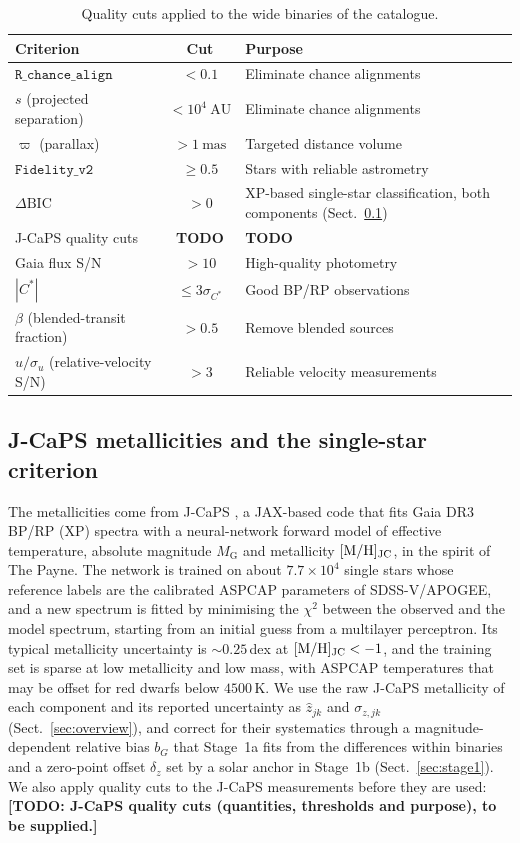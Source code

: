 \documentclass{aa}
\begin{document}
\begin{table}[ht]
\centering
\caption{Quality cuts applied to the wide binaries of the \citet{ElBadry2021MillionBinaries} catalogue.}
\label{tab:quality_cuts}
\begin{tabular}{@{}lcl@{}}
\toprule
Criterion & Cut & Purpose \\
\midrule
$\texttt{R\_chance\_align}$ & $<0.1$ & Eliminate chance alignments \\
$s$ (projected separation) & $<10^4~\mathrm{AU}$ & Eliminate chance alignments \\
$\varpi$ (parallax) & $>1~\mathrm{mas}$ & Targeted distance volume \\
$\texttt{Fidelity\_v2}$ & $\geq 0.5$ & Stars with reliable astrometry \\
$\Delta\mathrm{BIC}$ & $>0$ & XP-based single-star classification, both components (Sect.~\ref{sec:jcaps}) \\
J-CaPS quality cuts & \textbf{TODO} & \textbf{TODO} \\
Gaia flux S/N & $>10$ & High-quality photometry \\
$|C^\ast|$ & $\leq 3\sigma_{C^\ast}$ & Good BP/RP observations \\
$\beta$ (blended-transit fraction) & $>0.5$ & Remove blended sources \\
$u/\sigma_u$ (relative-velocity S/N) & $>3$ & Reliable velocity measurements \\
\bottomrule
\end{tabular}
\end{table}

\subsection{J-CaPS metallicities and the single-star criterion}\label{sec:jcaps}
The metallicities come from J-CaPS \citep{Li2026JCaPS}, a JAX-based code that fits Gaia DR3 BP/RP (XP) spectra with a neural-network forward model of effective temperature, absolute magnitude $M_{\mathrm{G}}$ and metallicity $[\mathrm{M/H}]_{\rm JC}$, in the spirit of The Payne. The network is trained on about $7.7\times10^4$ single stars whose reference labels are the calibrated ASPCAP parameters of SDSS-V/APOGEE, and a new spectrum is fitted by minimising the $\chi^2$ between the observed and the model spectrum, starting from an initial guess from a multilayer perceptron. Its typical metallicity uncertainty is $\sim0.25$\,dex at $[\mathrm{M/H}]_{\rm JC}<-1$, and the training set is sparse at low metallicity and low mass, with ASPCAP temperatures that may be offset for red dwarfs below $4500$\,K. We use the raw J-CaPS metallicity of each component and its reported uncertainty as $\widehat z_{jk}$ and $\sigma_{z,jk}$ (Sect.~\ref{sec:overview}), and correct for their systematics through a magnitude-dependent relative bias $b_G$ that Stage~1a fits from the differences within binaries and a zero-point offset $\delta_z$ set by a solar anchor in Stage~1b (Sect.~\ref{sec:stage1}). We also apply quality cuts to the J-CaPS measurements before they are used: \textbf{[TODO: J-CaPS quality cuts (quantities, thresholds and purpose), to be supplied.]}
\end{document}

